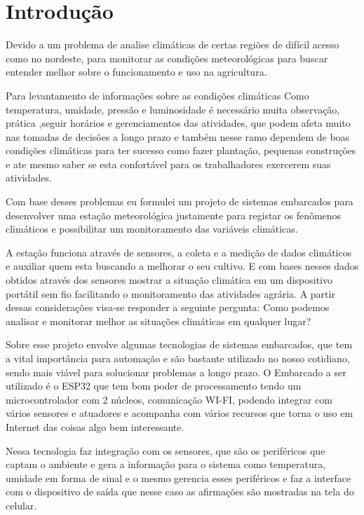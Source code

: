 \chapter{Introdução}
\label{}
Devido a um problema de analise climáticas de certas regiões de difícil acesso como no nordeste, para monitorar as condições meteorológicas para buscar entender melhor sobre o funcionamento e uso na agricultura. 

Para levantamento de informações sobre as condições climáticas Como temperatura, umidade, pressão e luminosidade é necessário muita observação, prática ,seguir horários e gerenciamentos das atividades, que podem afeta muito nas tomadas de decisões a longo prazo  e também nesse ramo dependem de boas condições climáticas para ter sucesso como fazer plantação, pequenas construções e ate mesmo saber se esta confortável para os trabalhadores exercerem suas atividades.  

Com base desses problemas eu formulei um projeto de sistemas embarcados para desenvolver uma estação meteorológica justamente para registar os fenômenos climáticos e possibilitar um monitoramento das variáveis climáticas.

A estação funciona através de sensores, a coleta e a medição de dados climáticos e auxiliar quem esta buscando a melhorar o seu cultivo. E com bases nesses dados obtidos através dos sensores mostrar a situação climática em um dispositivo portátil sem fio facilitando o monitoramento das atividades  agrária. A partir dessas considerações visa-se responder a seguinte pergunta: Como podemos analisar e monitorar melhor as situações climáticas em qualquer lugar? 

Sobre esse projeto envolve algumas tecnologias de sistemas embarcados, que tem a vital importância para automação e são bastante utilizado  no nosso cotidiano, sendo mais viável para solucionar problemas a longo prazo. O Embarcado a ser utilizado é o ESP32 que tem bom poder de processamento tendo um microcontrolador com 2 núcleos, comunicação WI-FI,  podendo integrar com vários sensores e atuadores e acompanha com vários recursos que torna o uso em Internet das coisas algo bem interessante. 

Nessa tecnologia faz integração com os sensores, que são os periféricos que captam o ambiente e gera a informação para o sistema como temperatura, umidade em forma de sinal e o mesmo gerencia esses periféricos e faz a interface com o dispositivo de saída que nesse caso as afirmações são mostradas na tela do celular.  

